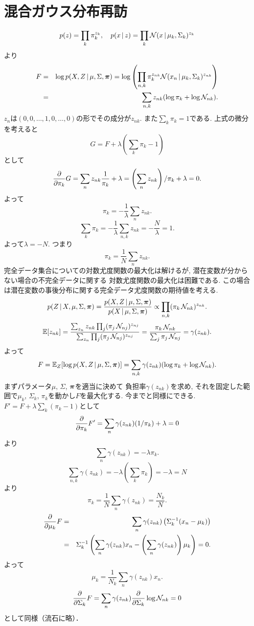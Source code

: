 \section{混合ガウス分布再訪}
$$
p(z)=\prod_k \pi_k^{z_{k}}, \quad p(x\,|\,z)=\prod_k {\cal N}(x\,|\,\mu_k,\Sigma_k)^{z_k}
$$
より
\begin{eqnarray*}
F
 &=& \log p(X,Z\,|\,\mu,\Sigma,\bm{\pi})
 = \log \left(\prod_{n,k} \pi_k^{z_{nk}}{\cal N}(x_n\,|\,\mu_k,\Sigma_k)^{z_{nk}}\right)\\
 &=& \sum_{n,k} z_{nk}(\log \pi_k + \log {\cal N}_{nk}).
\end{eqnarray*}
$z_n$は$(0, 0,\ldots, 1, 0, \ldots, 0)$の形でその成分が$z_{nk}$.
また$\sum_k \pi_k=1$である.
上式の微分を考えると
$$
G=F+\lambda\left(\sum_k \pi_k-1\right)
$$
として
$$
\frac{\partial}{\partial \pi_k}G=\sum_n z_{nk}\frac{1}{\pi_k}+\lambda=\left(\sum_n z_{nk}\right)/\pi_k + \lambda=0.
$$
よって
$$
\pi_k = -\frac{1}{\lambda}\sum_n z_{nk}.
$$
$$
\sum_k \pi_k=-\frac{1}{\lambda}\sum_{n,k}z_{nk}=-\frac{N}{\lambda}=1.
$$
よって$\lambda=-N$.
つまり
$$
\pi_k=\frac{1}{N}\sum_n z_{nk}.
$$
完全データ集合についての対数尤度関数の最大化は解けるが,
潜在変数が分からない場合の不完全データに関する
対数尤度関数の最大化は困難である.
この場合は潜在変数の事後分布に関する完全データ尤度関数の期待値を考える.
$$
p(Z\,|\,X,\mu,\Sigma,\bm{\pi})
 = \frac{p(X,Z\,|\,\mu,\Sigma,\bm{\pi})}{p(X\,|\,\mu,\Sigma,\bm{\pi})}
 \propto \prod_{n,k} (\pi_k\,{\cal N}_{nk})^{z_{nk}}.
$$
$$
\mathbb{E}[z_{nk}]=\frac{\sum_{z_n} z_{nk} \prod_j (\pi_j\,{\cal N}_{nj})^{z_{nj}}}
               {\sum_{z_n} \prod_j(\pi_j\,{\cal N}_{nj})^{z_{nj}}}
         =\frac{\pi_k\,{\cal N}_{nk}}{\sum_j \pi_j\,{\cal N}_{nj}} = \gamma(z_{nk}).
$$
よって
$$
F=\mathbb{E}_Z[\log p(X,Z\,|\,\mu,\Sigma,\bm{\pi})]=\sum_{n,k}\gamma(z_{nk})(\log \pi_k + \log {\cal N}_{nk}).
$$
まずパラメータ$\mu$, $\Sigma$, $\bm{\pi}$を適当に決めて
負担率$\gamma(z_{nk})$を求め,
それを固定した範囲で$\mu_k$, $\Sigma_k$, $\pi_k$を動かし$F$を最大化する.
今までと同様にできる.
$F'=F+\lambda\sum_k\left(\pi_k-1\right)$として
$$
\frac{\partial}{\partial \pi_k}F'=\sum_n \gamma(z_{nk})(1/\pi_k)+\lambda=0
$$
より
$$
\sum_n \gamma(z_{nk})=-\lambda \pi_k.
$$
$$
\sum_{n,k}\gamma(z_{nk})=-\lambda\left(\sum_k \pi_k\right)=-\lambda=N
$$
より
$$
\pi_k=\frac{1}{N}\sum_n \gamma(z_{nk})=\frac{N_k}{N}.
$$
\begin{eqnarray*}
\frac{\partial}{\partial \mu_k}F
&=&\sum_n\gamma(z_{nk})\left(\Sigma_k^{-1}(x_n-\mu_k)\right)
\\
&=&\Sigma_k^{-1}\left(\sum_n \gamma(z_{nk})x_n-\left(\sum_n \gamma(z_{nk})\right)\mu_k\right)=0.
\end{eqnarray*}
よって
$$
\mu_k=\frac{1}{N_k}\sum_n \gamma(z_{nk})x_n.
$$
$$
\frac{\partial}{\partial \Sigma_k}F=\sum_n \gamma(z_{nk}) \frac{\partial}{\partial \Sigma_k}\log {\cal N}_{nk}=0
$$
として同様（流石に略）．

